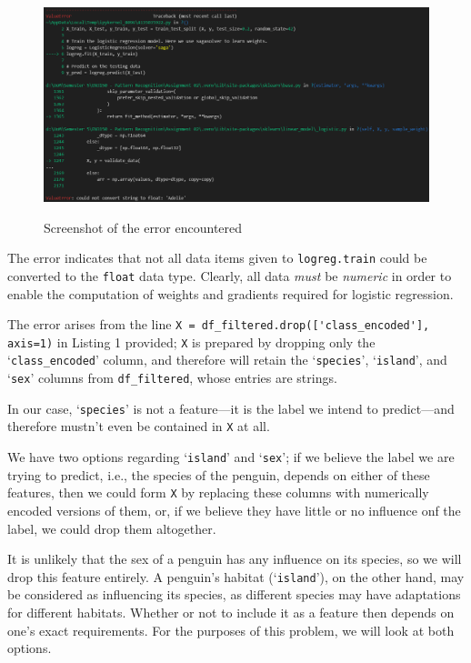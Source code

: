 \documentclass{article}[a4paper]
\begin{document}
	\begin{figure}[H]
		\centering
		\includegraphics[width=0.8\linewidth]{images/error.png}
		\label{error_scrnsht}
		\caption{Screenshot of the error encountered}
	\end{figure}

	The error indicates that not all data items given to \texttt{logreg.train} could be converted to the \texttt{float} data type. Clearly, all data \textit{must} be \textit{numeric} in order to enable the computation of weights and gradients required for logistic regression.

	The error arises from the line \lstinline|X = df_filtered.drop(['class_encoded'], axis=1)| in Listing 1 provided; \texttt{X} is prepared by dropping only the `\texttt{class\_encoded}' column, and therefore will retain the `\texttt{species}', `\texttt{island}', and `\texttt{sex}' columns from \texttt{df\_filtered}, whose entries are strings.

	In our case, `\texttt{species}' is not a feature---it is the label we intend to predict---and therefore mustn't even be contained in \texttt{X} at all.
	
	We have two options regarding `\texttt{island}' and `\texttt{sex}'; if we  believe the label we are trying to predict, i.e., the species of the penguin, depends on either of these features, then we could form \texttt{X} by replacing these columns with numerically encoded versions of them, or, if we believe they have little or no influence onf the label, we could drop them altogether.

	It is unlikely that the sex of a penguin has any influence on its species, so we will drop this feature entirely. A penguin's habitat (`\texttt{island}'), on the other hand, may be considered as influencing its species, as different species may have adaptations for different habitats. Whether or not to include it as a feature then depends on one's exact requirements. For the purposes of this problem, we will look at both options.
	
\end{document}
